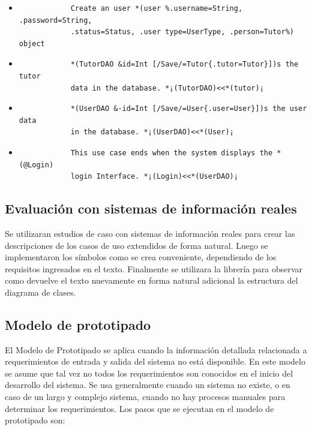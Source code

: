\documentclass[12pt,a4paper,final]{article}
\begin{document}
	\begin{itemize}
		\item \begin{verbatim}
			Create an user *(user %.username=String, .password=String,
			.status=Status, .user type=UserType, .person=Tutor%) object
		\end{verbatim}
		
		\item \begin{verbatim}
			*(TutorDAO &id=Int [/Save/=Tutor{.tutor=Tutor}])s the tutor 
			data in the database. *¡(TutorDAO)<<*(tutor)¡
		\end{verbatim}
	
		\item \begin{verbatim}
			*(UserDAO &-id=Int [/Save/=User{.user=User}])s the user data 
			in the database. *¡(UserDAO)<<*(User)¡
		\end{verbatim}
	
		\item \begin{verbatim}
			This use case ends when the system displays the *(@Login) 
			login Interface. *¡(Login)<<*(UserDAO)¡
		\end{verbatim}
		
	\end{itemize}
	
	\subsection{Evaluación con sistemas de información reales}
	
	Se utilizaran estudios de caso con sistemas de información reales para crear las descripciones de los casos de uso extendidos de forma natural. Luego se implementaron los símbolos como se crea conveniente, dependiendo de los requisitos ingresados en el texto. Finalmente se utilizara la librería para observar como devuelve el texto nuevamente en forma natural adicional la estructura del diagrama de clases.
	
	\subsection{Modelo de prototipado}
	El Modelo de Prototipado se aplica cuando la información detallada relacionada a requerimientos de entrada y salida del sistema no está disponible. En este modelo se asume que tal vez no todos los requerimientos son conocidos en el inicio del desarrollo del sistema. Se usa generalmente cuando un sistema no existe, o en caso de un largo y complejo sistema, cuando no hay procesos manuales para determinar los requerimientos. Los pasos que se ejecutan en el modelo de prototipado son: 
	
\end{document}
